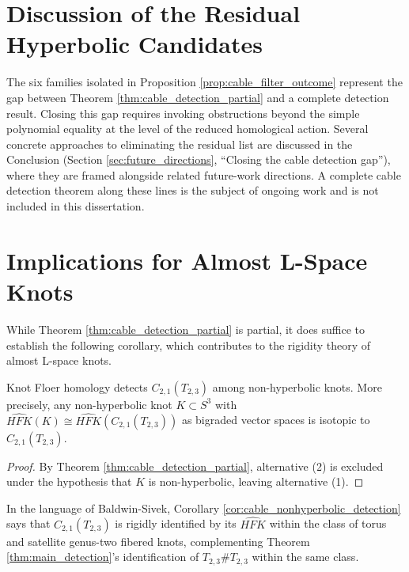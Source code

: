 \section{Discussion of the Residual Hyperbolic Candidates}\label{sec:cable_residual_discussion}

The six families isolated in Proposition \ref{prop:cable_filter_outcome} represent the gap between Theorem \ref{thm:cable_detection_partial} and a complete detection result. Closing this gap requires invoking obstructions beyond the simple polynomial equality at the level of the reduced homological action. Several concrete approaches to eliminating the residual list are discussed in the Conclusion (Section \ref{sec:future_directions}, ``Closing the cable detection gap''), where they are framed alongside related future-work directions. A complete cable detection theorem along these lines is the subject of ongoing work and is not included in this dissertation.

\section{Implications for Almost L-Space Knots}\label{sec:cable_implications}

While Theorem \ref{thm:cable_detection_partial} is partial, it does suffice to establish the following corollary, which contributes to the rigidity theory of almost L-space knots.

\begin{corollary}\label{cor:cable_nonhyperbolic_detection}
Knot Floer homology detects $C_{2,1}(T_{2,3})$ among non-hyperbolic knots.  More precisely, any non-hyperbolic knot $K \subset S^3$ with $\widehat{HFK}(K) \cong \widehat{HFK}(C_{2,1}(T_{2,3}))$ as bigraded vector spaces is isotopic to $C_{2,1}(T_{2,3})$.
\end{corollary}

\begin{proof}
By Theorem \ref{thm:cable_detection_partial}, alternative (2) is excluded under the hypothesis that $K$ is non-hyperbolic, leaving alternative (1).
\end{proof}

In the language of Baldwin-Sivek, Corollary \ref{cor:cable_nonhyperbolic_detection} says that $C_{2,1}(T_{2,3})$ is rigidly identified by its $\widehat{HFK}$ within the class of torus and satellite genus-two fibered knots, complementing Theorem \ref{thm:main_detection}'s identification of $T_{2,3}\#T_{2,3}$ within the same class.

